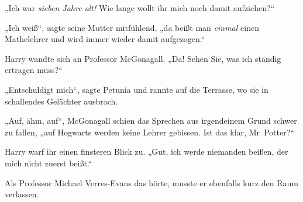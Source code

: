 „Ich war \emph{sieben Jahre alt!} Wie lange wollt ihr mich noch damit aufziehen?“

„Ich weiß“, sagte seine Mutter mitfühlend, „da beißt man \emph{einmal} einen Mathelehrer und wird immer wieder damit aufgezogen.“

Harry wandte sich an Professor McGonagall.
„Da! Sehen Sie, was ich ständig ertragen muss?“

„Entschuldigt mich“, sagte Petunia und rannte auf die Terrasse, wo sie in schallendes Gelächter ausbrach.

„Auf, ähm, auf“, McGonagall schien das Sprechen aus irgendeinem Grund schwer zu fallen, „auf Hogwarts werden keine Lehrer gebissen. Ist das klar, Mr~Potter?“

Harry warf ihr einen finsteren Blick zu.
„Gut, ich werde niemanden beißen, der mich nicht zuerst beißt.“

Als Professor Michael Verres-Evans das hörte, musste er ebenfalls kurz den Raum verlassen.

